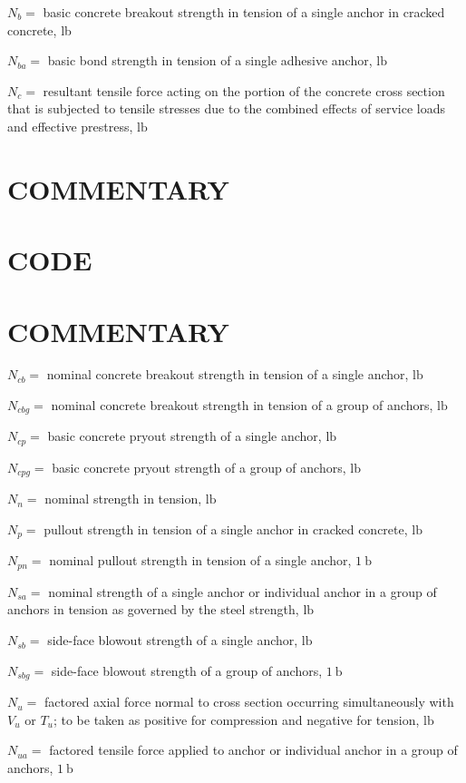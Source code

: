 \documentclass[10pt]{article}
\begin{document}
$N_{b}=$ basic concrete breakout strength in tension of a single anchor in cracked concrete, lb

$N_{b a}=$ basic bond strength in tension of a single adhesive anchor, $\mathrm{lb}$

$N_{c}=$ resultant tensile force acting on the portion of the concrete cross section that is subjected to tensile stresses due to the combined effects of service loads and effective prestress, $\mathrm{lb}$

\section*{COMMENTARY}
\section*{CODE}
\section*{COMMENTARY}
$N_{c b}=$ nominal concrete breakout strength in tension of a single anchor, $\mathrm{lb}$

$N_{c b g}=$ nominal concrete breakout strength in tension of a group of anchors, $\mathrm{lb}$

$N_{c p}=$ basic concrete pryout strength of a single anchor, $\mathrm{lb}$

$N_{c p g}=$ basic concrete pryout strength of a group of anchors, $\mathrm{lb}$

$N_{n}=$ nominal strength in tension, $\mathrm{lb}$

$N_{p}=$ pullout strength in tension of a single anchor in cracked concrete, $\mathrm{lb}$

$N_{p n}=$ nominal pullout strength in tension of a single anchor, $1 \mathrm{~b}$

$N_{s a}=$ nominal strength of a single anchor or individual anchor in a group of anchors in tension as governed by the steel strength, $\mathrm{lb}$

$N_{s b}=$ side-face blowout strength of a single anchor, $\mathrm{lb}$

$N_{s b g}=$ side-face blowout strength of a group of anchors, $1 \mathrm{~b}$

$N_{u}=$ factored axial force normal to cross section occurring simultaneously with $V_{u}$ or $T_{u}$; to be taken as positive for compression and negative for tension, $\mathrm{lb}$

$N_{u a}=$ factored tensile force applied to anchor or individual anchor in a group of anchors, $1 \mathrm{~b}$
\end{document}
